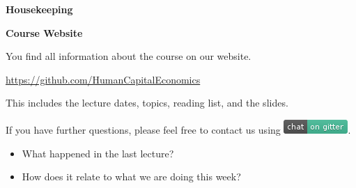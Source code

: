 \begin{frame}\begin{center}
	\LARGE\textbf{Housekeeping}
\end{center}\end{frame}
\begin{frame}
	\textbf{Course Website}\vspace{0.3cm}

You find all information about the course on our website.

\begin{center}
\url{https://github.com/HumanCapitalEconomics}
\end{center}

This includes the lecture dates, topics, reading list, and the slides.\vspace{0.3cm}

If you have further questions, please feel free to contact us using
\includegraphics[scale=0.5]{../../shared/fig-gitter}.

\end{frame}
\begin{frame}

\begin{itemize}\setlength\itemsep{1em}
\item What happened in the last lecture?
\item How does it relate to what we are doing this week?
\end{itemize}

\end{frame}
